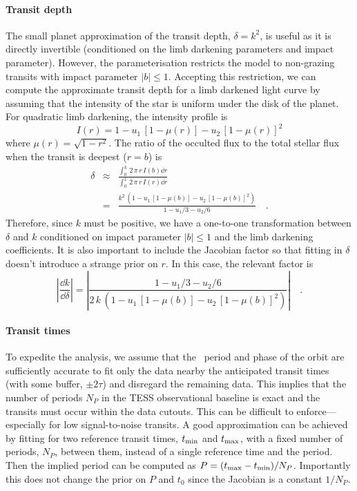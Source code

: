 \documentclass[floatfix,ApJL,twocolumn]{aastex631}
\begin{document}
\paragraph{Transit depth}
The small planet approximation of the transit depth, $\delta=k^2$, is useful as it is directly invertible (conditioned on the limb darkening parameters and impact parameter).
However, the parameterisation restricts the model to non-grazing transits with impact parameter $|b| \le 1$.
Accepting this restriction, we can compute the approximate transit depth for a limb darkened light curve by assuming that the intensity of the star is uniform under the disk of the planet.
For quadratic limb darkening, the intensity profile is
\begin{equation}
  I(r) = 1 - u_1\,[1 - \mu(r)] - u_2\,[1 - \mu(r)]^2
\end{equation}
where $\mu(r) = \sqrt{1 - r^2}$.
The ratio of the occulted flux to the total stellar flux when the transit is deepest ($r = b$) is \citep[the same results are discussed by][]{Mandel:2002,Csizmadia:2013, Agol:2020:AJ}
\begin{eqnarray}
  \delta &\approx& \frac{\int_0^k\,2\,\pi\,r\,I(b)\dd r}{\int_0^1\,2\,\pi\,r\,I(r)\dd r} \nonumber\\
  &=& \frac{k^2\,\left(1 - u_1\,[1 - \mu(b)] - u_2\,[1 - \mu(b)]^2\right)}{1 - u_1/3 - u_2/6}\quad.
\end{eqnarray}
Therefore, since $k$ must be positive, we have a one-to-one transformation between $\delta$ and $k$ conditioned on impact parameter $|b| \le 1$ and the limb darkening coefficients.
It is also important to include the Jacobian factor so that fitting in $\delta$ doesn't introduce a strange prior on $r$.
In this case, the relevant factor is
\begin{equation}
  \left|\frac{\dd k}{\dd \delta}\right| = \left|\frac{1 - u_1/3 - u_2/6}{2\,k\,\left(1 - u_1\,[1 - \mu(b)] - u_2\,[1 - \mu(b)]^2\right)}\right| \quad.
\end{equation}


\paragraph{Transit times}
To expedite the analysis, we assume that the \exofop\ period and phase of the orbit are sufficiently accurate to fit only the data nearby the anticipated transit times (with some buffer, $\pm2\tau$) and disregard the remaining data.
This implies that the number of periods $N_P$ in the TESS observational baseline is exact and the transits must occur within the data cutouts.
This can be difficult to enforce---especially for low signal-to-noise transits. 
A good approximation can be achieved by fitting for two reference transit times, $t_{\rm min}$ and $t_{\rm max}$, with a fixed number of periods, $N_P$, between them, instead of a single reference time and the period.
Then the implied period can be computed as $P = (t_{\rm max} - t_{\rm min}) / N_P$.
Importantly this does not change the prior on $P$ and $t_0$ since the Jacobian is a constant $1/N_P$.
\end{document}
